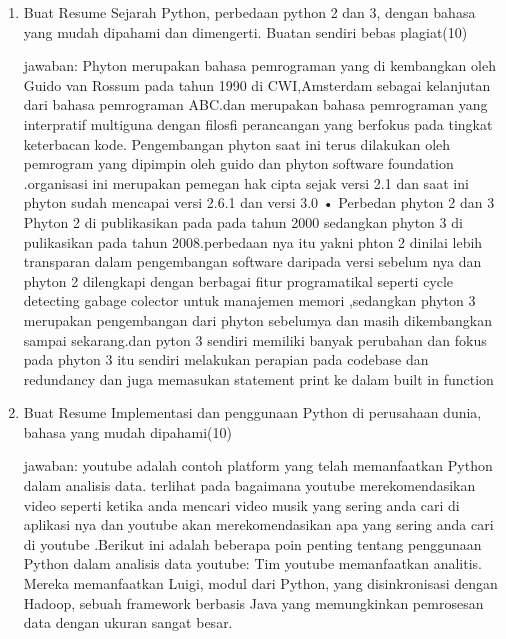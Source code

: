\begin{enumerate}
\item
Buat Resume Sejarah Python, perbedaan python 2 dan 3, dengan bahasa yang mudah dipahami dan dimengerti. Buatan sendiri bebas plagiat(10)

jawaban:
Phyton merupakan bahasa pemrograman yang di kembangkan oleh Guido van Rossum pada tahun 1990 di CWI,Amsterdam sebagai kelanjutan dari bahasa pemrograman ABC.dan merupakan bahasa pemrograman yang interpratif multiguna dengan filosfi perancangan yang berfokus pada tingkat keterbacan kode.
Pengembangan phyton saat ini terus dilakukan oleh pemrogram yang dipimpin oleh guido dan phyton software foundation .organisasi ini merupakan pemegan hak cipta sejak versi 2.1  dan saat ini phyton sudah mencapai versi 2.6.1 dan versi 3.0
•	Perbedan phyton 2 dan 3
Phyton 2 di publikasikan pada pada tahun 2000 sedangkan phyton 3 di pulikasikan pada tahun 2008.perbedaan nya itu yakni phton 2 dinilai lebih transparan dalam pengembangan software daripada versi sebelum nya dan phyton 2 dilengkapi dengan berbagai fitur programatikal seperti cycle detecting gabage colector untuk manajemen memori ,sedangkan phyton 3  merupakan pengembangan dari phyton sebelumya dan masih dikembangkan sampai sekarang.dan pyton 3 sendiri memiliki banyak perubahan dan fokus pada phyton 3 itu sendiri melakukan perapian pada codebase dan redundancy dan juga memasukan statement print ke dalam built  in  function 


\item
Buat Resume Implementasi dan penggunaan Python di perusahaan dunia, bahasa yang mudah dipahami(10)


jawaban:
youtube adalah contoh platform yang telah memanfaatkan Python dalam analisis data. terlihat pada bagaimana youtube merekomendasikan video seperti ketika anda mencari video musik yang sering anda cari di aplikasi nya dan youtube akan merekomendasikan apa yang sering anda cari di youtube .Berikut ini adalah beberapa poin penting tentang penggunaan Python dalam analisis data youtube:
Tim youtube memanfaatkan analitis. Mereka memanfaatkan Luigi, modul dari Python, yang disinkronisasi dengan Hadoop, sebuah framework berbasis Java yang memungkinkan pemrosesan data dengan ukuran sangat besar.


\end{enumerate}

